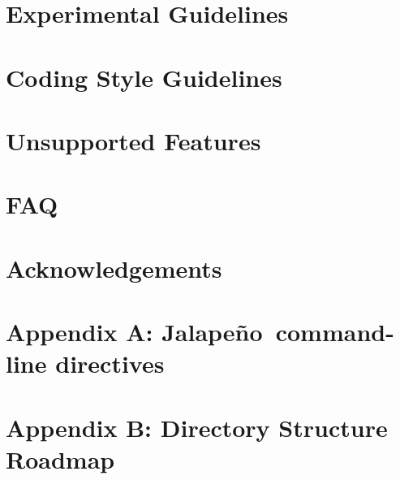 \documentclass{article}
\newcommand{\jp}{Jalape\~{n}o}
\begin{document}
\T \newpage
\section{Experimental Guidelines}


\T \newpage
\section{Coding Style Guidelines}


\T \newpage
\section{Unsupported Features}


\T \newpage
\section{FAQ}


\T \newpage
\section*{Acknowledgements}


\T \newpage
\T 
\T 

\T \newpage
\section{Appendix A: \jp\ command-line directives}
\label{appendix:nonadaptive:cmdline}


\T \newpage 
\section{Appendix B: Directory Structure Roadmap}
\label{directories}


\W \section*{\indexname}\label{hlxindex}
\W \htmlprintindex
\T \printindex
\end{document}
